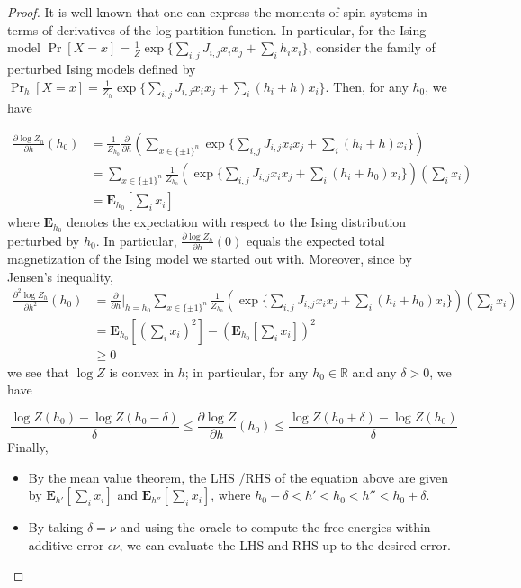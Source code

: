 \documentclass[final, 12pt]{colt2018}
\newcommand{\R}{\mathbb{R}}
\theoremstyle{definition}
\theoremstyle{plain}
\begin{document}
\begin{proof}
It is well known that one can express the moments of spin systems in terms of derivatives of the log partition function. In particular, for the Ising model $\Pr[X=x]=\frac{1}{Z}\exp\{\sum_{i,j}J_{i,j}x_{i}x_{j}+\sum_{i}h_{i}x_{i}\}$,
consider the family of perturbed Ising models defined by $\Pr_{h}[X=x]=\frac{1}{Z_{h}}\exp\{\sum_{i,j}J_{i,j}x_{i}x_{j}+\sum_{i}(h_{i}+h)x_{i}\}$.
Then, for any $h_{0}$, we have 

\begin{align*}
\frac{\partial\log Z_{h}}{\partial h}(h_{0}) & =\frac{1}{Z_{h_{0}}}\frac{\partial}{\partial h}\left(\sum_{x\in\{\pm1\}^{n}}\exp\{\sum_{i,j}J_{i,j}x_{i}x_{j}+\sum_{i}(h_{i}+h)x_{i}\}\right)\\
 & =\sum_{x\in\{\pm1\}^{n}}\frac{1}{Z_{h_{0}}}\left(\exp\{\sum_{i,j}J_{i,j}x_{i}x_{j}+\sum_{i}(h_{i}+h_{0})x_{i}\}\right)\left(\sum_{i}x_{i}\right)\\
 & =\boldsymbol{E}_{h_{0}}[\sum_{i}x_{i}]
\end{align*}
where $\boldsymbol{E}_{h_{0}}$ denotes the expectation with respect
to the Ising distribution perturbed by $h_{0}$. In particular, $\frac{\partial\log Z_{h}}{\partial h}(0)$
equals the expected total magnetization of the Ising model we started
out with. Moreover, since by Jensen's inequality,
\begin{align*}
\frac{\partial^{2}\log Z_{h}}{\partial h^{2}}(h_{0}) & =\frac{\partial}{\partial h}|_{h=h_{0}}\sum_{x\in\{\pm1\}^{n}}\frac{1}{Z_{h_{0}}}\left(\exp\{\sum_{i,j}J_{i,j}x_{i}x_{j}+\sum_{i}(h_{i}+h_{0})x_{i}\}\right)\left(\sum_{i}x_{i}\right)\\
 & =\boldsymbol{E}_{h_{0}}[(\sum_{i}x_{i})^{2}]-(\boldsymbol{E}_{h_{0}}[\sum_{i}x_{i}])^{2}\\
 & \geq0
\end{align*}
we see that $\log Z$ is convex in $h$; in particular, for any $h_{0}\in\R$
and any $\delta>0$, we have 

\[
\frac{\log Z(h_{0})-\log Z(h_{0}-\delta)}{\delta}\leq\frac{\partial\log Z}{\partial h}(h_{0})\leq\frac{\log Z(h_{0}+\delta)-\log Z(h_{0})}{\delta} 
\]
Finally, 
\begin{itemize}
\item By the mean value theorem, the LHS /RHS  of the equation above are given by 
$\boldsymbol{E}_{h'}[\sum_{i}x_{i}]$ and $\boldsymbol{E}_{h''}[\sum_{i}x_{i}]$, where
$h_0 - \delta < h' < h_0 < h'' < h_0 + \delta$.
\item By taking $\delta = \nu$ and using the oracle to compute the free energies within additive error $\epsilon \nu$, we can evaluate the LHS and RHS up to the desired error.
\end{itemize}


\end{proof}
\end{document}
